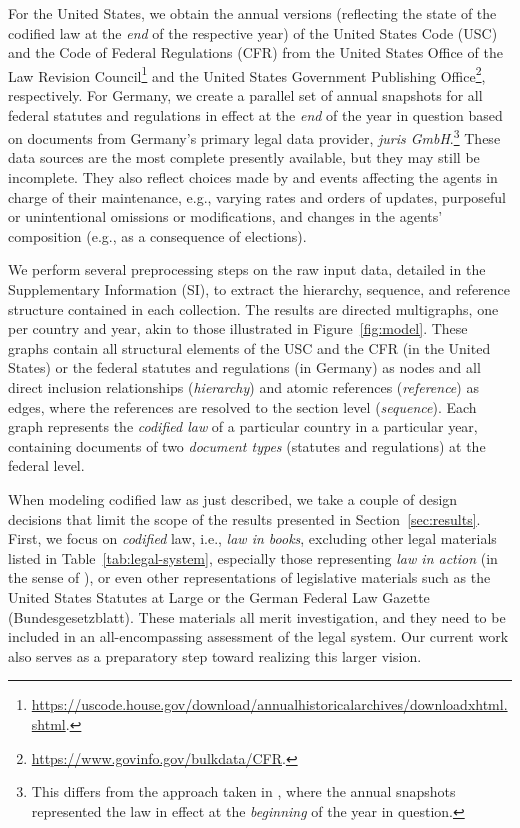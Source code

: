 \documentclass[utf8,sort&compress,table,hidelinks]{frontiersFPHY} %
\newcommand{\thesi}{SI\xspace}
\begin{document}
For the United States, we obtain the annual versions (reflecting the state of the codified law at the \emph{end} of the respective year) of the United States Code (USC) and the Code of Federal Regulations (CFR) from the United States Office of the Law Revision Council\footnote{\url{https://uscode.house.gov/download/annualhistoricalarchives/downloadxhtml.shtml}.} and the United States Government Publishing Office\footnote{\url{https://www.govinfo.gov/bulkdata/CFR}.}, respectively.
For Germany, we create a parallel set of annual snapshots for all federal statutes and regulations in effect at the \emph{end} of the year in question based on documents from Germany’s primary legal data provider, \emph{juris GmbH}.\footnote{
This differs from the approach taken in \cite{katz2020}, where the annual snapshots represented the law in effect at the \emph{beginning} of the year in question.
}
These data sources are the most complete presently available, 
but they may still be incomplete.
They also reflect choices made by and events affecting the agents in charge of their maintenance, e.g., varying rates and orders of updates, purposeful or unintentional omissions or modifications, and changes in the agents' composition (e.g., as a consequence of elections).

We perform several preprocessing steps on the raw input data, detailed in the Supplementary Information (\thesi), to extract the hierarchy, sequence, and reference structure contained in each collection.
The results are directed multigraphs, one per country and year, akin to those illustrated in Figure~\ref{fig:model}. 
These graphs contain all structural elements of the USC and the CFR (in the United States) or the federal statutes and regulations (in Germany) as nodes 
and all direct inclusion relationships (\emph{hierarchy}) and atomic references (\emph{reference}) as edges, where the references are resolved to the section level (\emph{sequence}).
Each graph represents the \emph{codified law} of a particular country in a particular year, containing documents of two \emph{document types} (statutes and regulations) at the federal level.

When modeling codified law as just described, we take a couple of design decisions that limit the scope of the results presented in Section~\ref{sec:results}. 
First, we focus on \emph{codified} law, i.e., \emph{law in books}, excluding other legal materials listed in Table~\ref{tab:legal-system}, especially those representing \emph{law in action} (in the sense of \cite{pound1910}),  
or even other representations of legislative materials such as the United States Statutes at Large or the German Federal Law Gazette (Bundesgesetzblatt).
These materials all merit investigation, and they need to be included in an all-encompassing assessment of the legal system. 
Our current work also serves as a preparatory step toward realizing this larger vision.
\end{document}
